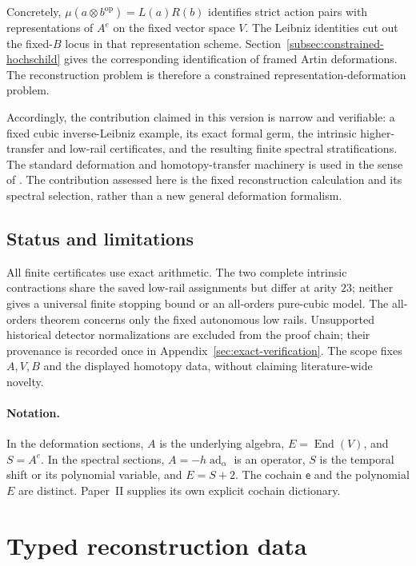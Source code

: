 \documentclass[11pt]{amsart}
\newcommand{\End}{\operatorname{End}}
\begin{document}
Concretely, $\mu(a\otimes b^{\mathrm{op}})=L(a)R(b)$ identifies strict
action pairs with representations of $A^e$ on the fixed vector space $V$.
The Leibniz identities cut out the fixed-$B$ locus in that representation
scheme. Section~\ref{subsec:constrained-hochschild} gives the corresponding
identification of framed Artin deformations. The reconstruction problem is
therefore a constrained representation-deformation problem.

Accordingly, the contribution claimed in this version is narrow and verifiable: a fixed cubic inverse-Leibniz example, its exact formal germ, the intrinsic higher-transfer and low-rail certificates, and the resulting finite spectral stratifications.  The standard deformation and homotopy-transfer machinery is used in the sense of
\cite{GerstenhaberSchack1988,Manetti2005,LodayVallette2012}. The contribution assessed here is
the fixed reconstruction calculation and its spectral selection, rather than a new general
deformation formalism.

\subsection*{Status and limitations}
All finite certificates use exact arithmetic. The two complete intrinsic
contractions share the saved low-rail assignments but differ at arity $23$;
neither gives a universal finite stopping bound or an all-orders pure-cubic
model. The all-orders theorem concerns only the fixed autonomous low rails.
Unsupported historical detector normalizations are excluded from the proof
chain; their provenance is recorded once in Appendix~\ref{sec:exact-verification}.
The scope fixes $A,V,B$ and the displayed homotopy data, without claiming
literature-wide novelty.

\paragraph{Notation.}
In the deformation sections, $A$ is the underlying algebra, $E=\End(V)$,
and $S=A^e$. In the spectral sections, $A=-h\operatorname{ad}_\alpha$
is an operator, $S$ is the temporal shift or its polynomial variable,
and $E=S+2$. The cochain $\mathsf e$ and the polynomial $E$ are distinct.
Paper~II supplies its own explicit cochain dictionary.

\section{Typed reconstruction data}
\end{document}
